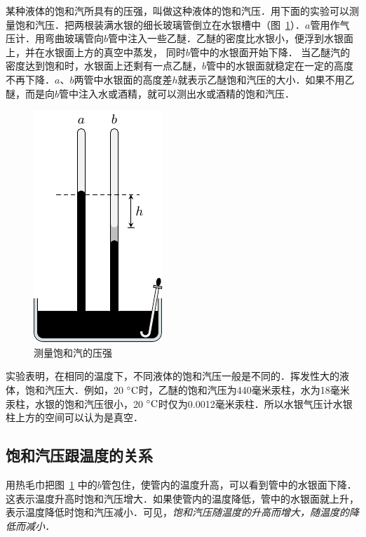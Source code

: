 某种液体的饱和汽所具有的压强，叫做这种液体的饱和汽压．用下面的实验可以测量饱和汽压．把两根装满水银的细长玻璃管倒立在水银槽中（图~\ref{fig_B_5-3}）．$a$管用作气压计．用弯曲玻璃管向$b$管中注入一些乙醚．乙醚的密度比水银小，便浮到水银面上，并在水银面上方的真空中蒸发，
同时$b$管中的水银面开始下降．
当乙醚汽的密度达到饱和时，水银面上还剩有一点乙醚，$b$管中的水银面就稳定在一定的高度不再下降．$a$、$b$两管中水银面的高度差$h$就表示乙醚饱和汽压的大小．如果不用乙醚，而是向$b$管中注入水或酒精，就可以测出水或酒精的饱和汽压．
\begin{figure}[htbp]
  \centering
  \includegraphics{fig/B/5-3.pdf}
  \caption{测量饱和汽的压强}\label{fig_B_5-3}
\end{figure}

实验表明，在相同的温度下，不同液体的饱和汽压一般是不同的．挥发性大的液体，饱和汽压大．例如，20$\;{}^\circ\text{C}$时，乙醚的饱和汽压为440毫米汞柱，水为18毫米汞柱，水银的饱和汽压很小，20$\;{}^\circ\text{C}$时仅为0.0012毫米汞柱．所以水银气压计水银柱上方的空间可以认为是真空．

\subsection{饱和汽压跟温度的关系} 

用热毛巾把图~\ref{fig_B_5-3} 中的$b$管包住，使管内的温度升高，可以看到管中的水银面下降．这表示温度升高时饱和汽压增大．如果使管内的温度降低，管中的水银面就上升，表示温度降低时饱和汽压减小．可见，\textit{饱和汽压随温度的升高而增大，随温度的降低而减小．}

